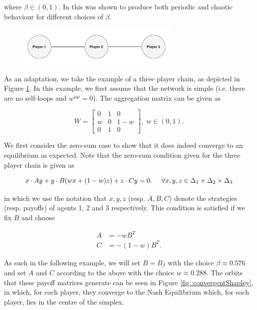 \documentclass{article}
\theoremstyle{definition}
\begin{document}
  where $\beta \in (0, 1)$. In \cite{} this was shown to produce both periodic and chaotic behaviour for different choices of $\beta$. 

  \begin{figure}[t]
    \centering
    \includegraphics[width = 0.7\textwidth]{Figures/ThreePlayerNetwork.png}
    \caption{\label{fig::ThreePlayerNetwork}}
  \end{figure}

  As an adaptation, we take the example of a three player chain, as depicted in Figure \ref{fig::ThreePlayerNetwork}. In this example, we first assume that the network is simple (i.e. there are no self-loops and $w^{\mu \mu} = 0$). The aggregation matrix can be given as

  \begin{equation}
    W = \begin{bmatrix}
      0 & 1 & 0 \\
      w & 0 & 1 - w \\
      0 & 1 & 0
    \end{bmatrix}, \; w \in (0, 1).
  \end{equation}


  We first consider the zero-sum case to show that it does indeed converge to an equilibrium as expected. Note that the zero-sum condition given for the three player chain is given as

  \begin{equation}
    x \cdot A y + y \cdot B (w x + (1-w)z) + z \cdot C y = 0. \hspace{0.5cm} \forall x, y, z \in \Delta_1 \times \Delta_2 \times \Delta_3
  \end{equation}

  in which we use the notation that $x, y, z$ (resp. $A, B, C$) denote the strategies (resp. payoffs) of agents 1, 2 and 3 respectively. This condition is satisfied if we fix $B$ and choose

  \begin{align}
    A & = - w B^T \\
    C & = - (1 - w) B^T. 
  \end{align}

  As such in the following example, we will set $B = B_\beta$ with the choice $\beta \approx 0.576$ and set $A$ and $C$ according to the above with the choice $w \approx 0.288$. The orbits that these payoff matrices generate can be seen in Figure \ref{fig::convergentShapley}, in which, for each player, they converge to the Nash Equilibrium which, for each player, lies in the centre of the simplex.
\end{document}
